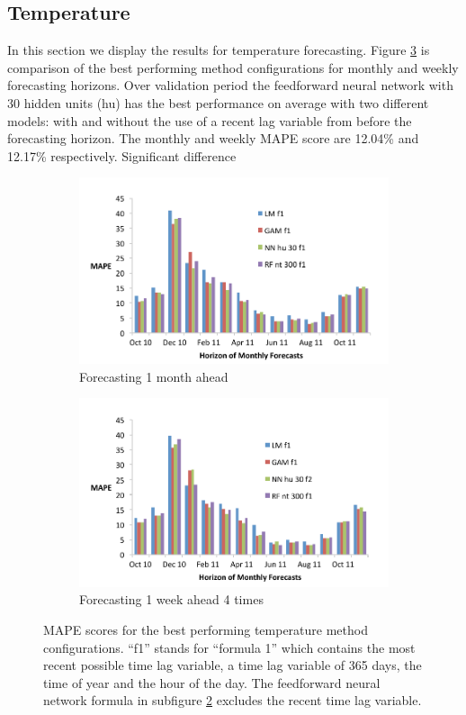 \documentclass[conference]{IEEEtran}
\begin{document}
\subsection{Temperature}
In this section we display the results for temperature forecasting. Figure \ref{fig:temp-results} is comparison of the best performing method configurations for monthly and weekly forecasting horizons. Over validation period the feedforward neural network with 30 hidden units (hu) has the best performance on average with two different models: with and without the use of a recent lag variable from before the forecasting horizon. The monthly and weekly MAPE score are 12.04\% and 12.17\% respectively. Significant difference 
\begin{figure}[!ht]
\centering
\begin{subfigure}[b]{\linewidth}
\includegraphics[width=\linewidth]{gfx/results/temp/TEMP-MONTHLY-BEST-COLUMNS.pdf}
\caption{Forecasting 1 month ahead}
\label{subfig:best-temp-methods-monthly-pred}
\end{subfigure}
\begin{subfigure}[b]{\linewidth}
\includegraphics[width=\linewidth]{gfx/results/temp/TEMP-WEEKLY-BEST-COLUMNS.pdf}
\caption{Forecasting 1 week ahead 4 times}
\label{subfig:best-temp-methods}
\end{subfigure}
\caption{MAPE scores for the best performing temperature method configurations. ``f1'' stands for ``formula 1'' which contains the most recent possible time lag variable, a time lag variable of 365 days, the time of year and the hour of the day. The feedforward neural network formula in subfigure \ref{subfig:best-temp-methods} excludes the recent time lag variable.}
\label{fig:temp-results}
\end{figure}
\end{document}
